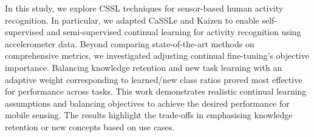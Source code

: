 In this study, we explore CSSL techniques for sensor-based human activity recognition. In particular, we adapted CaSSLe \cite{fini2022self} and Kaizen \cite{tang2023practical} to enable self-supervised and semi-supervised continual learning for activity recognition using accelerometer data. Beyond comparing state-of-the-art methods on comprehensive metrics, we investigated adjusting continual fine-tuning's objective importance. Balancing knowledge retention and new task learning with an adaptive weight corresponding to learned/new class ratios proved most effective for performance across tasks. This work demonstrates realistic continual learning assumptions and balancing objectives to achieve the desired performance for mobile sensing. The results highlight the trade-offs in emphasising knowledge retention or new concepts based on use cases.

